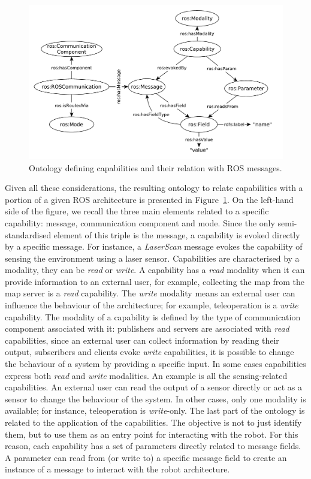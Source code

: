 \begin{figure}[t]
\centering
\includegraphics[width=\textwidth]{gfx/onto/comptocapa1}
\caption{Ontology defining capabilities and their relation with ROS messages.}
\label{fig:onto-capa}
\end{figure}

Given all these considerations, the resulting ontology to relate capabilities with a portion of a given ROS architecture is presented in Figure~\ref{fig:onto-capa}. On the left-hand side of the figure, we recall the three main elements related to a specific capability: message, communication component and mode. Since the only semi-standardised element of this triple is the message, a capability is evoked directly by a specific message. For instance, a \textit{LaserScan} message evokes the capability of sensing the environment using a laser sensor. Capabilities are characterised by a modality, they can be \textit{read} or \textit{write}. A capability has a \textit{read} modality when it can provide information to an external user, for example, collecting the map from the map server is a \textit{read} capability. The \textit{write} modality means an external user can influence the behaviour of the architecture; for example, teleoperation is a \textit{write} capability. The modality of a capability is defined by the type of communication component associated with it: publishers and servers are associated with \textit{read} capabilities, since an external user can collect information by reading their output, subscribers and clients evoke \textit{write} capabilities, it is possible to change the behaviour of a system by providing a specific input. In some cases capabilities express both \textit{read} and \textit{write} modalities. An example is all the sensing-related capabilities. An external user can read the output of a sensor directly or act as a sensor to change the behaviour of the system. In other cases, only one modality is available; for instance, teleoperation is \textit{write}-only. The last part of the ontology is related to the application of the capabilities. The objective is not to just identify them, but to use them as an entry point for interacting with the robot. For this reason, each capability has a set of parameters directly related to message fields. A parameter can read from (or write to) a specific message field to create an instance of a message to interact with the robot architecture.

